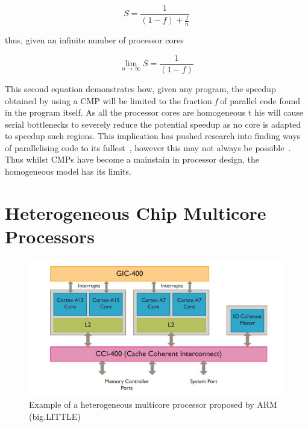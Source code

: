 \begin{equation}
S = \frac{1}{(1-f) + \frac{f}{n}}
\end{equation}\label{amdlaw}

thus, given an infinite number of processor cores~\cite{ekhout2010amdalh}

\begin{equation}
\lim_{n\to\infty} S = \frac{1}{(1-f)}
\end{equation}

This second equation demonstrates how, given any program, the speedup obtained by using a CMP will be limited to the fraction \textit{f} of parallel code found in the program itself.
As all the processor cores are homogeneous t	his will cause serial bottlenecks to severely reduce the potential speedup as no core is adapted to speedup such regions.
This implication has pushed research into finding ways of parallelising code to its fullest~\cite{}, however this may not always be possible~\cite{}.
Thus whilst CMPs have become a mainstain in processor design, the homogeneous model has its limits.

\section{Heterogeneous Chip Multicore Processors}

\begin{figure}[t]
 \center
 \includegraphics[width=1\textwidth]{background/graphics/biglittle.png}
 \caption{Example of a heterogeneous multicore processor proposed by ARM (big.LITTLE)}\label{fig:blarm}
\end{figure}

